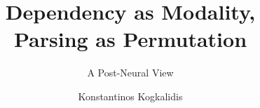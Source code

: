 \documentclass[utrecht]{lotdiss}
\title{Dependency as Modality, \\Parsing as Permutation}
\subtitle{A Post-Neural View}
\author{Konstantinos Kogkalidis}
\begin{document}
\FrontMatter


\MainMatter







\BackMatter
\setcounter{section}{0}
\renewcommand*{\thesection}{\Alph{section}}

\end{document}
